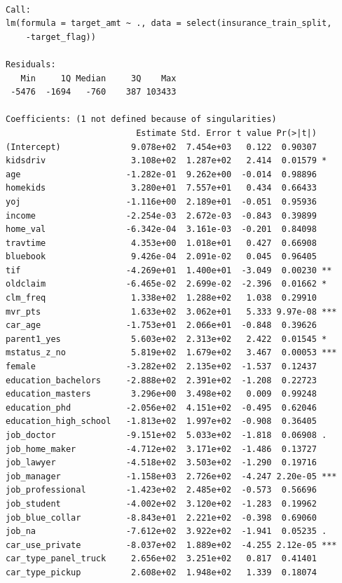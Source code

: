 \documentclass[
  11pt]{article}
\begin{document}
\begin{verbatim}

Call:
lm(formula = target_amt ~ ., data = select(insurance_train_split, 
    -target_flag))

Residuals:
   Min     1Q Median     3Q    Max 
 -5476  -1694   -760    387 103433 

Coefficients: (1 not defined because of singularities)
                          Estimate Std. Error t value Pr(>|t|)    
(Intercept)              9.078e+02  7.454e+03   0.122  0.90307    
kidsdriv                 3.108e+02  1.287e+02   2.414  0.01579 *  
age                     -1.282e-01  9.262e+00  -0.014  0.98896    
homekids                 3.280e+01  7.557e+01   0.434  0.66433    
yoj                     -1.116e+00  2.189e+01  -0.051  0.95936    
income                  -2.254e-03  2.672e-03  -0.843  0.39899    
home_val                -6.342e-04  3.161e-03  -0.201  0.84098    
travtime                 4.353e+00  1.018e+01   0.427  0.66908    
bluebook                 9.426e-04  2.091e-02   0.045  0.96405    
tif                     -4.269e+01  1.400e+01  -3.049  0.00230 ** 
oldclaim                -6.465e-02  2.699e-02  -2.396  0.01662 *  
clm_freq                 1.338e+02  1.288e+02   1.038  0.29910    
mvr_pts                  1.633e+02  3.062e+01   5.333 9.97e-08 ***
car_age                 -1.753e+01  2.066e+01  -0.848  0.39626    
parent1_yes              5.603e+02  2.313e+02   2.422  0.01545 *  
mstatus_z_no             5.819e+02  1.679e+02   3.467  0.00053 ***
female                  -3.282e+02  2.135e+02  -1.537  0.12437    
education_bachelors     -2.888e+02  2.391e+02  -1.208  0.22723    
education_masters        3.296e+00  3.498e+02   0.009  0.99248    
education_phd           -2.056e+02  4.151e+02  -0.495  0.62046    
education_high_school   -1.813e+02  1.997e+02  -0.908  0.36405    
job_doctor              -9.151e+02  5.033e+02  -1.818  0.06908 .  
job_home_maker          -4.712e+02  3.171e+02  -1.486  0.13727    
job_lawyer              -4.518e+02  3.503e+02  -1.290  0.19716    
job_manager             -1.158e+03  2.726e+02  -4.247 2.20e-05 ***
job_professional        -1.423e+02  2.485e+02  -0.573  0.56696    
job_student             -4.002e+02  3.120e+02  -1.283  0.19962    
job_blue_collar         -8.843e+01  2.221e+02  -0.398  0.69060    
job_na                  -7.612e+02  3.922e+02  -1.941  0.05235 .  
car_use_private         -8.037e+02  1.889e+02  -4.255 2.12e-05 ***
car_type_panel_truck     2.656e+02  3.251e+02   0.817  0.41401    
car_type_pickup          2.608e+02  1.948e+02   1.339  0.18074    

\end{verbatim}
\end{document}
